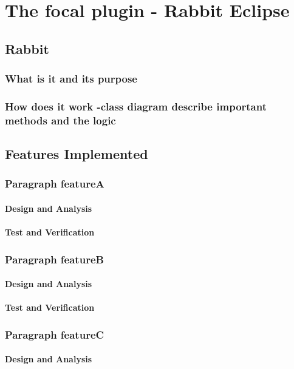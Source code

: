 \chapter{The focal plugin - Rabbit Eclipse}
\label{cha:TheEclipseIDE:RabbitEclipse}
\section{Rabbit}
\subsection{What is it and its purpose}
\subsection{How does it work -class diagram describe important methods and the logic}
\section{Features Implemented}

\subsection{Paragraph featureA}
	\subsubsection{Design and Analysis}
	\subsubsection{Test and Verification}
\subsection{Paragraph featureB}
	\subsubsection{Design and Analysis}
	\subsubsection{Test and Verification}

\subsection{Paragraph featureC}
	\subsubsection{Design and Analysis}
